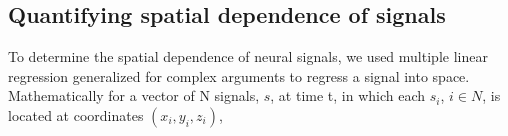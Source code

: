 

\subsection*{Quantifying spatial dependence of signals}
To determine the spatial dependence of neural signals, we used multiple linear regression generalized for complex arguments to regress a signal into space. Mathematically for a vector of N signals, $s$, at time t, in which each $s_i$, $i \in N$, is located at coordinates $(x_i,y_i,z_i)$,

